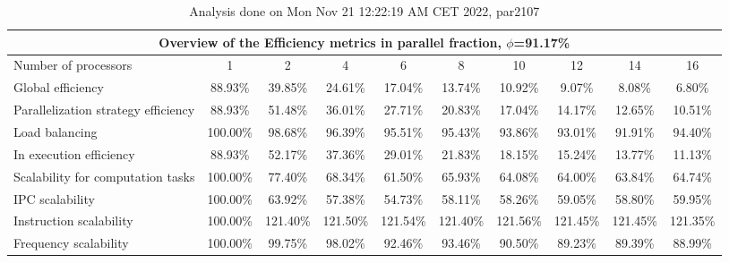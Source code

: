 \begin{table}[h]
\begin{center}
\begin{tabular}{|l|c|c|c|c|c|c|c|c|c|}
\hline
\multicolumn{10}{|c|}{Overview of the Efficiency metrics in parallel fraction, $\phi$=91.17\%} \\
\hline
\hline
Number of processors & 1 & 2 & 4 & 6 & 8 & 10 & 12 & 14 & 16 \\
\hline
\hline
Global efficiency                      &     88.93\% &     39.85\% &     24.61\% &     17.04\% &     13.74\% &     10.92\% &      9.07\% &      8.08\% &      6.80\% \\
\hline
\hline
Parallelization strategy efficiency &     88.93\% &     51.48\% &     36.01\% &     27.71\% &     20.83\% &     17.04\% &     14.17\% &     12.65\% &     10.51\% \\
\hline
Load balancing                   &    100.00\% &     98.68\% &     96.39\% &     95.51\% &     95.43\% &     93.86\% &     93.01\% &     91.91\% &     94.40\% \\
In execution efficiency          &     88.93\% &     52.17\% &     37.36\% &     29.01\% &     21.83\% &     18.15\% &     15.24\% &     13.77\% &     11.13\% \\
\hline
\hline
Scalability for computation tasks   &    100.00\% &     77.40\% &     68.34\% &     61.50\% &     65.93\% &     64.08\% &     64.00\% &     63.84\% &     64.74\% \\
\hline
IPC scalability                  &    100.00\% &     63.92\% &     57.38\% &     54.73\% &     58.11\% &     58.26\% &     59.05\% &     58.80\% &     59.95\% \\
Instruction scalability          &    100.00\% &    121.40\% &    121.50\% &    121.54\% &    121.40\% &    121.56\% &    121.45\% &    121.45\% &    121.35\% \\
Frequency scalability            &    100.00\% &     99.75\% &     98.02\% &     92.46\% &     93.46\% &     90.50\% &     89.23\% &     89.39\% &     88.99\% \\
\hline
\end{tabular}
\end{center}
\caption{ Analysis done on Mon Nov 21 12:22:19 AM CET 2022, par2107}
\end{table}
